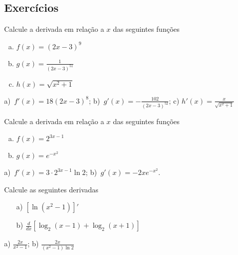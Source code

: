 \subsection{Exercícios}

\begin{exer}
  Calcule a derivada em relação a $x$ das seguintes funções
  \begin{enumerate}[a)]
  \item $\displaystyle f(x) = (2x-3)^{9}$
  \item $\displaystyle g(x) = \frac{1}{(2x-3)^{51}}$
  \item $\displaystyle h(x) = \sqrt{x^2+1}$
  \end{enumerate}
\end{exer}
\begin{resp}
  a)~$\displaystyle f'(x) = 18(2x-3)^8$; b)~$\displaystyle g'(x) = -\frac{102}{(2x-3)^{52}}$; c) $\displaystyle h'(x)=\frac{x}{\sqrt{x^2+1}}$
\end{resp}

\begin{exer}
  Calcule a derivada em relação a $x$ das seguintes funções
  \begin{enumerate}[a)]
  \item $\displaystyle f(x) = 2^{3x-1}$
  \item $\displaystyle g(x) = e^{-x^2}$
  \end{enumerate}
\end{exer}
\begin{resp}
  a)~$\displaystyle f'(x) = 3\cdot 2^{3x-1}\ln 2$; b)~$\displaystyle g'(x) = -2xe^{-x^2}$.
\end{resp}

\begin{exer}
  Calcule as seguintes derivadas
  \begin{enumerate}
  \item[a)] $\displaystyle\left[\ln\left(x^2-1\right)\right]'$ 
  \item[b)] $\displaystyle\frac{d}{dx}\left[\log_2(x-1) + \log_2(x+1)\right]$ 
  \end{enumerate}
\end{exer}
\begin{resp}
  a) $\displaystyle\frac{2x}{x^2-1}$; b) $\displaystyle\frac{2x}{(x^2-1)\ln 2}$
\end{resp}


